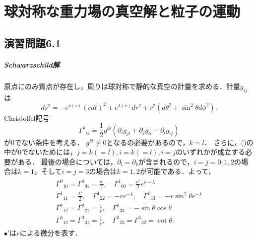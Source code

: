 \documentclass[a4paper]{ltjsreport}
\begin{document}
\chapter{球対称な重力場の真空解と粒子の運動}
\section*{演習問題6.1}
\paragraph{Schwarzschild解}
原点にのみ質点が存在し，周りは球対称で静的な真空の計量を求める．計量$g_{ij}$は
\[ ds^2= - e^{\nu(r)}(cdt)^2 + e^{\lambda(r)}dr^2 + r^2(d\theta^2 + \sin^2\theta{}d\phi^2) . \]
Christoffel記号
\[ {\Gamma^k}_{ij}=\frac{1}{2}g^{kl}\left(\partial_ig_{jl} + \partial_jg_{li} - \partial_lg_{ij}\right) \]
が0でない条件を考える．
$g^{kl} \neq 0$となるの必要があるので，$k=l$．
さらに，()の中が0でないためには，$j=k(=l), i=k(=l), i=j$のいずれかが成立する必要がある．
最後の場合については，$\partial_l=\partial_k$が含まれるので，$i=j=0, 1, 2$の場合は$k=1$，そして$i=j=3$の場合は$k=1, 2$が可能である．よって，
\begin{align}
  \begin{split}
    {\Gamma^0}_{10}={\Gamma^0}_{01}=\frac{\nu'}{2}, \quad{}{\Gamma^1}_{00}=\frac{\nu'}{2}e^{\nu - \lambda}\\
    {\Gamma^1}_{11}=\frac{\lambda'}{2}, \quad{}{\Gamma^1}_{22}= - re^{ - \lambda}, \quad{}{\Gamma^1}_{33}= - r\sin^2\theta{}e^{ - \lambda}\\
    {\Gamma^2}_{12}={\Gamma^2}_{21}=\frac{1}{r}, \quad{\Gamma^2}_{33}= - \sin\theta\cos\theta\\
    {\Gamma^3}_{13}={\Gamma^3}_{31}=\frac{1}{r}, \quad{\Gamma^3}_{23}={\Gamma^3}_{32}=\cot\theta .
  \end{split}
\end{align}
$\bullet'$は$r$による微分を表す．
\end{document}
